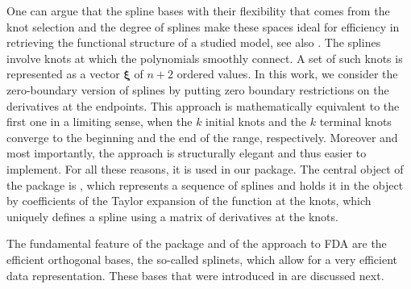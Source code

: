 One can argue that the spline bases with their flexibility that comes from the knot selection and the {   degree of splines} make these spaces ideal for 
 efficiency in retrieving the functional
structure of a studied model, see also \citep{basna2022data}.
 The splines involve knots at which the polynomials smoothly connect. 
A set of such knots is represented as a vector $\boldsymbol \xi$ of $n+2$ ordered values. 
In this work, we consider the zero-boundary version of splines by putting zero boundary restrictions on the derivatives at the endpoints.
This approach is mathematically equivalent to the first one in a limiting sense, when the $k$ initial knots and the $k$ terminal knots converge to the beginning and the end of the range, respectively.  Moreover and most importantly, the approach is structurally elegant and thus easier to implement.
For all these reasons, it is used in our package.   
The central object of the package is , which represents a sequence of splines and holds it in the object by coefficients of the Taylor expansion of the function at the knots, which uniquely defines a spline using a matrix of derivatives at the knots. 



The fundamental feature of the package and of the approach to FDA are the efficient orthogonal bases, the so-called splinets, which allow for a very efficient data representation. 
These bases that were introduced in \citep{LIU2022} are discussed next. 


\vspace{-.13cm}
